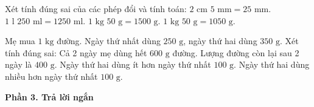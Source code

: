 \begin{ex} %
Xét tính đúng sai của các phép đổi và tính toán:
\choiceTF
{\True $2\text{ cm } 5\text{ mm} = 25\text{ mm}$.}
{\True $1\text{ l } 250\text{ ml} = 1250\text{ ml}$.}
{$1\text{ kg } 50\text{ g} = 1500\text{ g}$.}
{\True $1\text{ kg } 50\text{ g} = 1050\text{ g}$.}
\end{ex}

\begin{ex} %
Mẹ mua $1\text{ kg}$ đường. Ngày thứ nhất dùng $250\text{ g}$, ngày thứ hai dùng $350\text{ g}$. Xét tính đúng sai:
\choiceTF
{\True Cả 2 ngày mẹ dùng hết $600\text{ g}$ đường.}
{\True Lượng đường còn lại sau 2 ngày là $400\text{ g}$.}
{Ngày thứ hai dùng ít hơn ngày thứ nhất $100\text{ g}$.}
{\True Ngày thứ hai dùng nhiều hơn ngày thứ nhất $100\text{ g}$.}
\end{ex}

\textbf{Phần 3. Trả lời ngắn}

